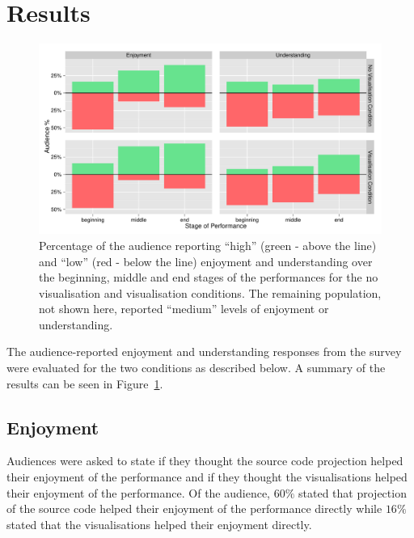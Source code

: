 \section{Results}

\begin{figure}
  \centering
  \includegraphics[width=\columnwidth]{../study-3/results/dimension-condition-study-3.pdf}
  \caption[Follow-up user study survey condition and dimension results]{Percentage of the audience reporting ``high'' (green - above the line) and ``low'' (red - below the line) enjoyment and understanding over the beginning, middle and end stages of the performances for the no visualisation and visualisation conditions. The remaining population, not shown here, reported ``medium'' levels of enjoyment or understanding.}
  \label{fig:dimension-condition-follow-up-user-study}
\end{figure}

The audience-reported enjoyment and understanding responses from the survey were evaluated for the two conditions as described below. A summary of the results can be seen in Figure~\ref{fig:dimension-condition-follow-up-user-study}.

\subsection{Enjoyment}



Audiences were asked to state if they thought the source code projection helped their enjoyment of the performance and if they thought the visualisations helped their enjoyment of the performance. Of the audience, $60\%$ stated that projection of the source code helped their enjoyment of the performance directly while $16\%$ stated that the visualisations helped their enjoyment directly.

